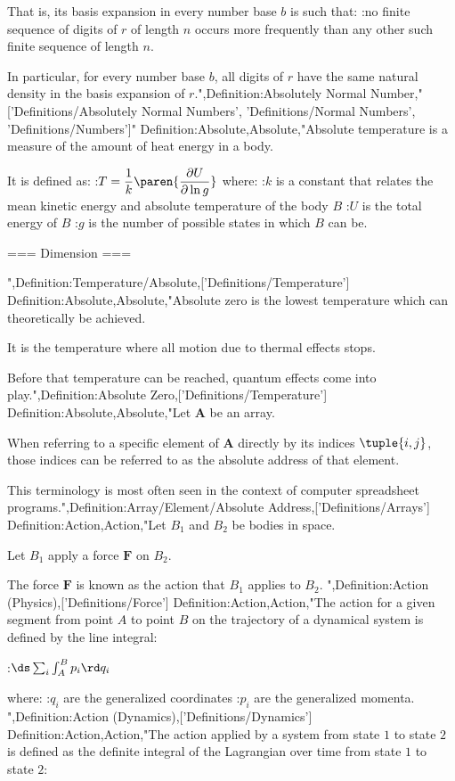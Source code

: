 That is,  its basis expansion in every number base $b$ is such that:
:no finite sequence of digits of $r$ of length $n$ occurs more frequently than any other such finite sequence of length $n$.


In particular, for every number base $b$, all digits of $r$ have the same natural density in the basis expansion of $r$.",Definition:Absolutely Normal Number,"['Definitions/Absolutely Normal Numbers', 'Definitions/Normal Numbers', 'Definitions/Numbers']"
Definition:Absolute,Absolute,"Absolute temperature is a measure of the amount of heat energy in a body.

It is defined as:
:$T = \dfrac 1 k \paren {\dfrac {\partial U} {\partial \ln g} }$
where:
:$k$ is a constant that relates the mean kinetic energy and absolute temperature of the body $B$
:$U$ is the total energy of $B$
:$g$ is the number of possible states in which $B$ can be.


=== Dimension ===

",Definition:Temperature/Absolute,['Definitions/Temperature']
Definition:Absolute,Absolute,"Absolute zero is the lowest temperature which can theoretically be achieved.

It is the temperature where all motion due to thermal effects stops.

Before that temperature can be reached, quantum effects come into play.",Definition:Absolute Zero,['Definitions/Temperature']
Definition:Absolute,Absolute,"Let $\mathbf A$ be an array.


When referring to a specific element of $\mathbf A$ directly by its indices $\tuple {i, j}$, those indices can be referred to as the absolute address of that element.

This terminology is most often seen in the context of computer spreadsheet programs.",Definition:Array/Element/Absolute Address,['Definitions/Arrays']
Definition:Action,Action,"Let $B_1$ and $B_2$ be bodies in space.

Let $B_1$ apply a force $\mathbf F$ on $B_2$.

The force $\mathbf F$ is known as the action that $B_1$ applies to $B_2$.
",Definition:Action (Physics),['Definitions/Force']
Definition:Action,Action,"The action for a given segment from point $A$ to point $B$ on the trajectory of a dynamical system is defined by the line integral:

:$\ds \sum_i \int_A^B p_i \rd q_i$

where:
:$q_i$ are the generalized coordinates
:$p_i$ are the generalized momenta.
",Definition:Action (Dynamics),['Definitions/Dynamics']
Definition:Action,Action,"The action applied by a system from state $1$ to state $2$ is defined as the definite integral of the Lagrangian over time from state $1$ to state $2$:

